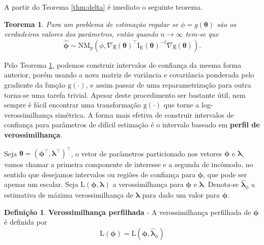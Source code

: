 \documentclass[
  9pt,
  a5paper,
]{book}
\newtheorem{theorem}{Teorema}[chapter]
\theoremstyle{definition}
\newtheorem{definition}{Definição}[chapter]
\theoremstyle{definition}
\theoremstyle{definition}
\theoremstyle{definition}
\theoremstyle{remark}
\begin{document}
A partir do Teorema \ref{thm:delta} é imediato o seguinte teorema.

\begin{theorem}
\protect\hypertarget{thm:deltadis}{}\label{thm:deltadis}Para um problema de estimação regular se \(\phi = g(\boldsymbol{\theta})\) são os verdadeiros valores dos parâmetros, então quando \(n \to \infty\) tem-se que
\[ \hat{\boldsymbol{\phi}} \sim \mathrm{NM_p}(\phi, \nabla \mathrm{g}(\boldsymbol{\theta})^\top \mathrm{I_E}(\boldsymbol{\theta})^{-1}  \nabla \mathrm{g}(\boldsymbol{\theta})). \]
\end{theorem}

Pelo Teorema \ref{thm:deltadis}, podemos construir intervalos de confiança da mesma forma anterior, porém usando a nova matriz de variância e covariância ponderada pelo gradiente da função \(\mathrm{g}(\cdot)\), e assim passar de uma reparametrização para outra torna-se uma tarefa trivial. Apesar deste procedimento ser bastante útil, nem sempre é fácil encontrar uma transformação \(\mathrm{g}(\cdot)\) que torne a log-verossimilhança simétrica. A forma mais efetiva de construir intervalos de confiança para parâmetros de difícil estimação é o intervalo baseado em \textbf{perfil de verossimilhança}.

Seja \(\boldsymbol{\theta} = (\boldsymbol{\phi}^\top, \boldsymbol{\lambda}^\top)^\top\), o vetor de parâmetros particionado nos vetores \(\boldsymbol{\phi}\) e \(\boldsymbol{\lambda}\), vamos chamar a primeira componente de interesse e a segunda de incômodo, no sentido que desejamos intervalos ou regiões de confiança para \(\boldsymbol{\phi}\), que pode ser apenas um escalar. Seja \(\mathrm{L}(\boldsymbol{\phi}, \boldsymbol{\lambda})\) a verossimilhança para \(\boldsymbol{\phi}\) e \(\boldsymbol{\lambda}\). Denota-se \(\hat{\boldsymbol{\lambda}}_{\phi}\) a estimativa de máxima verossimilhança de \(\boldsymbol{\lambda}\) para dado um valor para \(\boldsymbol{\phi}\).

\begin{definition}
\protect\hypertarget{def:perfilhada}{}\label{def:perfilhada}\textbf{Verossimilhança perfilhada} - A verossimilhança perfilhada de \(\boldsymbol{\phi}\) é definida por
\[ \mathrm{L}(\boldsymbol{\phi}) = \mathrm{L}(\boldsymbol{\phi}, \hat{\boldsymbol{\lambda}}_{\phi}) \]
\end{definition}
\end{document}

